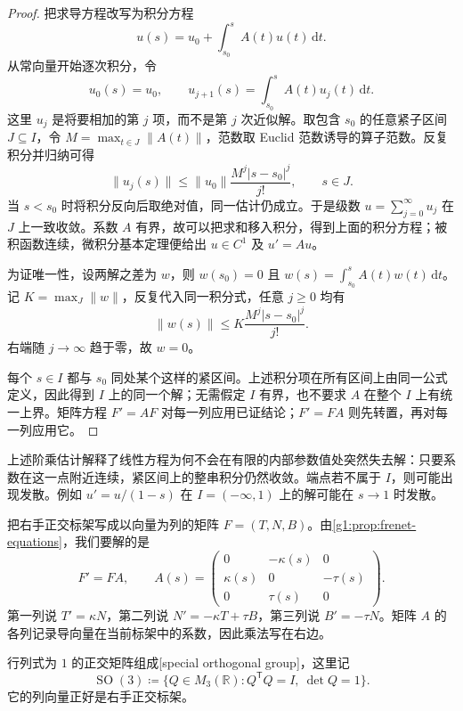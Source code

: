 \begin{proof}
	把求导方程改写为积分方程
	\[
		u(s)=u_0+\int_{s_0}^s A(t)u(t)\,\mathrm{d}t.
	\]
	从常向量开始逐次积分，令
	\[
		u_0(s)=u_0,\qquad u_{j+1}(s)=\int_{s_0}^s A(t)u_j(t)\,\mathrm{d}t.
	\]
	这里 \(u_j\) 是将要相加的第 \(j\) 项，而不是第 \(j\) 次近似解。取包含 \(s_0\) 的任意紧子区间 \(J\subseteq I\)，令 \(M=\max_{t\in J}\lVert A(t)\rVert\)，范数取 Euclid 范数诱导的算子范数。反复积分并归纳可得
	\[
		\lVert u_j(s)\rVert\leq\lVert u_0\rVert\frac{M^j|s-s_0|^j}{j!},\qquad s\in J.
	\]
	当 \(s<s_0\) 时将积分反向后取绝对值，同一估计仍成立。于是级数 \(u=\sum_{j=0}^{\infty}u_j\) 在 \(J\) 上一致收敛。系数 \(A\) 有界，故可以把求和移入积分，得到上面的积分方程；被积函数连续，微积分基本定理便给出 \(u\in C^1\) 及 \(u'=Au\)。

	为证唯一性，设两解之差为 \(w\)，则 \(w(s_0)=0\) 且 \(w(s)=\int_{s_0}^s A(t)w(t)\,\mathrm{d}t\)。记 \(K=\max_J\lVert w\rVert\)，反复代入同一积分式，任意 \(j\geq0\) 均有
	\[
		\lVert w(s)\rVert\leq K\frac{M^j|s-s_0|^j}{j!}.
	\]
	右端随 \(j\to\infty\) 趋于零，故 \(w=0\)。

	每个 \(s\in I\) 都与 \(s_0\) 同处某个这样的紧区间。上述积分项在所有区间上由同一公式定义，因此得到 \(I\) 上的同一个解；无需假定 \(I\) 有界，也不要求 \(A\) 在整个 \(I\) 上有统一上界。矩阵方程 \(F'=AF\) 对每一列应用已证结论；\(F'=FA\) 则先转置，再对每一列应用它。
\end{proof}

上述阶乘估计解释了线性方程为何不会在有限的内部参数值处突然失去解：只要系数在这一点附近连续，紧区间上的整串积分仍然收敛。端点若不属于 \(I\)，则可能出现发散。例如 \(u'=u/(1-s)\) 在 \(I=(-\infty,1)\) 上的解可能在 \(s\to1\) 时发散。

\ProseParagraphBreak

把右手正交标架写成以向量为列的矩阵 \(F=(T,N,B)\)。由\cref{g1:prop:frenet-equations}，我们要解的是
\begin{equation}
	\label{g1:eq:frenet-matrix}
	F'=FA,\qquad
	A(s)=
	\begin{pmatrix}
		0&-\kappa(s)&0\\
		\kappa(s)&0&-\tau(s)\\
		0&\tau(s)&0
	\end{pmatrix}.
\end{equation}
第一列说 \(T'=\kappa N\)，第二列说 \(N'=-\kappa T+\tau B\)，第三列说 \(B'=-\tau N\)。矩阵 \(A\) 的各列记录导向量在当前标架中的系数，因此乘法写在右边。

\ProseParagraphBreak

行列式为 \(1\) 的正交矩阵组成[special orthogonal group]，这里记
\[
	\operatorname{SO}(3)\coloneqq\{Q\in M_3(\mathbb R):Q^{\mathsf T}Q=I,\ \det Q=1\}.
\]
它的列向量正好是右手正交标架。

